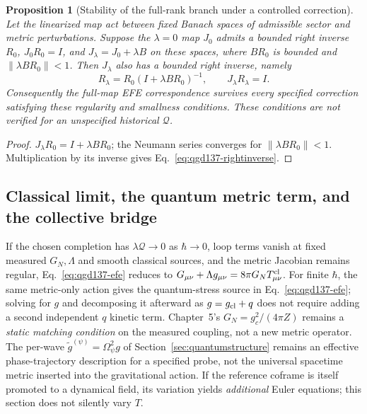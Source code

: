 \documentclass[11pt,a4paper]{article}
\newtheorem{proposition}[theorem]{Proposition}
\begin{document}
\begin{proposition}[Stability of the full-rank branch under a controlled correction]
\label{prop:qgd137-smalllambda}
Let the linearized map act between fixed Banach spaces of admissible
sector and metric perturbations. Suppose the $\lambda=0$
map $J_0$ admits a \emph{bounded} right inverse $R_0$,
$J_0R_0=I$, and $J_\lambda=J_0+\lambda B$ on these spaces,
where $BR_0$ is bounded and $\|\lambda BR_0\|<1$.
Then $J_\lambda$ also has a bounded right inverse, namely
\begin{equation}\label{eq:qgd137-rightinverse}
\boxed{R_\lambda=R_0\left(I+\lambda BR_0\right)^{-1},
\qquad J_\lambda R_\lambda=I.}
\end{equation}
Consequently the full-map EFE correspondence survives every
\emph{specified} correction satisfying these regularity and
smallness conditions. These conditions are not verified for an
unspecified historical $\mathcal Q$.
\end{proposition}
\begin{proof}
$J_\lambda R_0=I+\lambda BR_0$; the Neumann series converges
for $\|\lambda BR_0\|<1$. Multiplication by its inverse gives
Eq.~\eqref{eq:qgd137-rightinverse}.
\end{proof}

\subsection{Classical limit, the quantum metric term, and the collective bridge}
If the chosen completion has $\lambda\mathcal Q\to0$ as
$\hbar\to0$, loop terms vanish at fixed measured $G_N,\Lambda$
and smooth classical sources, and the metric Jacobian remains
regular, Eq.~\eqref{eq:qgd137-efe} reduces to
$G_{\mu\nu}+\Lambda g_{\mu\nu}=8\pi G_NT^{\rm cl}_{\mu\nu}$.
For finite $\hbar$, the same metric-only action gives the
quantum-stress source in Eq.~\eqref{eq:qgd137-efe}; solving for
$g$ and decomposing it afterward as $g=g_{\rm cl}+q$ does not
require adding a second independent $q$ kinetic term.
Chapter~5's $G_N=g_c^2/(4\pi Z)$ remains a \emph{static matching
condition} on the measured coupling, not a new metric operator.
The per-wave $\widetilde g^{(\psi)}=\Omega_\psi^2g$
of Section~\ref{sec:quantumstructure} remains an effective
phase-trajectory description for a specified probe, not the
universal spacetime metric inserted into the gravitational action.
If the reference coframe is itself promoted to a dynamical
field, its variation yields \emph{additional} Euler equations;
this section does not silently vary $T$.
\end{document}
